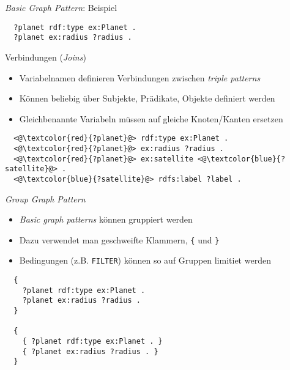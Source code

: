 \documentclass{beamer}
\begin{document}
\begin{frame}[fragile]{\emph{Basic Graph Pattern}: Beispiel}
    
    \Large
	\begin{lstlisting}		
  ?planet rdf:type ex:Planet .
  ?planet ex:radius ?radius .
	\end{lstlisting}
	
\end{frame}

\begin{frame}[fragile]{Verbindungen (\emph{Joins})}
	
	\begin{itemize}
		\item Variabelnamen definieren Verbindungen zwischen \emph{triple patterns}
		\item Können beliebig über Subjekte, Prädikate, Objekte definiert werden
		\item Gleichbenannte Variabeln müssen auf gleiche Knoten/Kanten ersetzen
	\end{itemize}
	
	\vspace{0.5cm}
	\large
	\begin{lstlisting}		
  <@\textcolor{red}{?planet}@> rdf:type ex:Planet .
  <@\textcolor{red}{?planet}@> ex:radius ?radius .
  <@\textcolor{red}{?planet}@> ex:satellite <@\textcolor{blue}{?satellite}@> .
  <@\textcolor{blue}{?satellite}@> rdfs:label ?label .
    \end{lstlisting}
	
\end{frame}

\begin{frame}[fragile]{\emph{Group Graph Pattern}}
	
	\begin{itemize}
		\item \emph{Basic graph patterns} können gruppiert werden
		\item Dazu verwendet man geschweifte Klammern, \texttt{\{} und \texttt{\}}
		\item Bedingungen (z.B. \texttt{FILTER}) können so auf Gruppen limitiet werden
	\end{itemize}
	
	\begin{lstlisting}
  {
    ?planet rdf:type ex:Planet .
    ?planet ex:radius ?radius .
  }

  {
    { ?planet rdf:type ex:Planet . }
    { ?planet ex:radius ?radius . }
  }
	\end{lstlisting}
	    
\end{frame}
\end{document}
